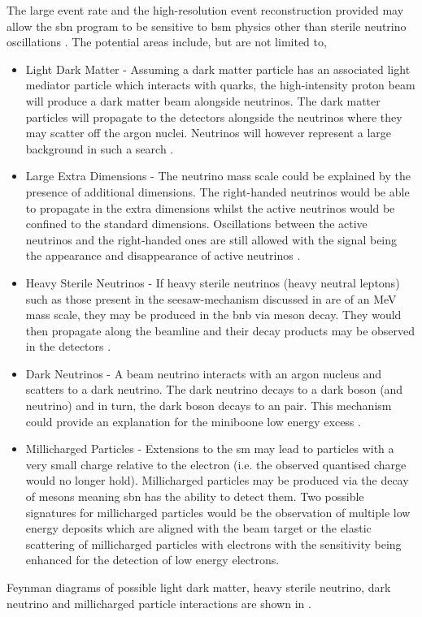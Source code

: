 The large event rate and the high-resolution event reconstruction provided may allow the \gls{sbn} program to be sensitive to \gls{bsm} physics other than sterile neutrino oscillations \cite{SBN_paper}. The potential areas include, but are not limited to,
\begin{itemize}
    \item Light Dark Matter - Assuming a dark matter particle has an associated light mediator particle which interacts with quarks, the high-intensity proton beam will produce a dark matter beam alongside neutrinos. The dark matter particles will propagate to the detectors alongside the neutrinos where they may scatter off the argon nuclei. Neutrinos will however represent a large background in such a search \cite{SBN_paper}. 
    \item Large Extra Dimensions - The neutrino mass scale could be explained by the presence of additional dimensions. The right-handed neutrinos would be able to propagate in the extra dimensions whilst the active neutrinos would be confined to the standard dimensions. Oscillations between the active neutrinos and the right-handed ones are still allowed with the signal being the appearance and disappearance of active neutrinos \cite{SBN_paper}. 
    \item Heavy Sterile Neutrinos - If heavy sterile neutrinos (heavy neutral leptons) such as those present in the seesaw-mechanism discussed in  are of an MeV mass scale, they may be produced in the \gls{bnb} via meson decay. They would then propagate along the beamline and their decay products may be observed in the detectors \cite{SBN_paper}\cite{MeV_scale_sterile_neutrino}.
    \item Dark Neutrinos - A beam neutrino interacts with an argon nucleus and scatters to a dark neutrino. The dark neutrino decays to a dark boson (and neutrino) and in turn, the dark boson decays to an \positron \electron pair. This mechanism could provide an explanation for the \gls{miniboone} low energy excess \cite{SBN_paper}\cite{dark_neutrino}. 
    \item Millicharged Particles - Extensions to the \gls{sm} may lead to particles with a very small charge relative to the electron (i.e. the observed quantised charge would no longer hold). Millicharged particles may be produced via the decay of mesons meaning \gls{sbn} has the ability to detect them. Two possible signatures for millicharged particles would be the observation of multiple low energy deposits which are aligned with the beam target or the elastic scattering of millicharged particles with electrons with the sensitivity being enhanced for the detection of low energy electrons.
\end{itemize}
Feynman diagrams of possible light dark matter, heavy sterile neutrino, dark neutrino and millicharged particle interactions are shown in .

